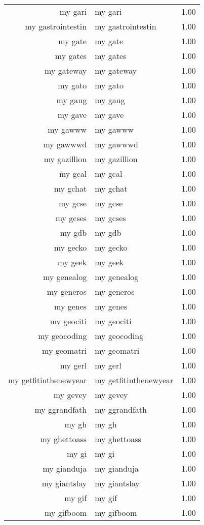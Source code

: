 \begin{table}[ht]
\begin{tabular}{rlr}
  my gari & my gari & 1.00 \\ 
  my gastrointestin & my gastrointestin & 1.00 \\ 
  my gate & my gate & 1.00 \\ 
  my gates & my gates & 1.00 \\ 
  my gateway & my gateway & 1.00 \\ 
  my gato & my gato & 1.00 \\ 
  my gaug & my gaug & 1.00 \\ 
  my gave & my gave & 1.00 \\ 
  my gawww & my gawww & 1.00 \\ 
  my gawwwd & my gawwwd & 1.00 \\ 
  my gazillion & my gazillion & 1.00 \\ 
  my gcal & my gcal & 1.00 \\ 
  my gchat & my gchat & 1.00 \\ 
  my gcse & my gcse & 1.00 \\ 
  my gcses & my gcses & 1.00 \\ 
  my gdb & my gdb & 1.00 \\ 
  my gecko & my gecko & 1.00 \\ 
  my geek & my geek & 1.00 \\ 
  my genealog & my genealog & 1.00 \\ 
  my generos & my generos & 1.00 \\ 
  my genes & my genes & 1.00 \\ 
  my geociti & my geociti & 1.00 \\ 
  my geocoding & my geocoding & 1.00 \\ 
  my geomatri & my geomatri & 1.00 \\ 
  my gerl & my gerl & 1.00 \\ 
  my getfitinthenewyear & my getfitinthenewyear & 1.00 \\ 
  my gevey & my gevey & 1.00 \\ 
  my ggrandfath & my ggrandfath & 1.00 \\ 
  my gh & my gh & 1.00 \\ 
  my ghettoass & my ghettoass & 1.00 \\ 
  my gi & my gi & 1.00 \\ 
  my gianduja & my gianduja & 1.00 \\ 
  my giantslay & my giantslay & 1.00 \\ 
  my gif & my gif & 1.00 \\ 
  my gifboom & my gifboom & 1.00 \\ 

\end{tabular}
\end{table}

